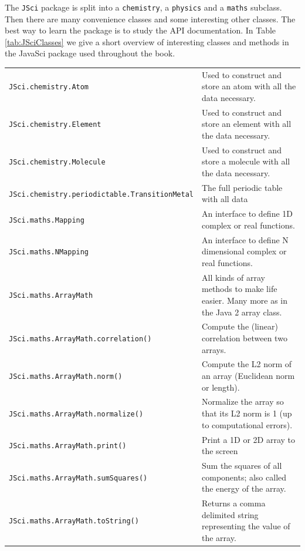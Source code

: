 The \verb|JSci| package is split into a 
\verb|chemistry|, a \verb|physics| and a \verb|maths| subclass.
Then there are many convenience classes and some interesting other classes.
The best way to learn the package is to study the API documentation. 
In Table \ref{tab:JSciClasses} we give a short overview of interesting 
classes and methods in the JavaSci package used throughout the book.
\begin{table}
  \begin{center} \small
    \begin{tabular}{ll}
      \verb|JSci.chemistry.Atom| & Used to construct and store an atom 
                                   with all the data necessary.\\
      \verb|JSci.chemistry.Element| & Used to construct and store an element 
                                   with all the data necessary.\\
      \verb|JSci.chemistry.Molecule| & Used to construct and store a molecule 
                                   with all the data necessary.\\
      \verb|JSci.chemistry.periodictable.TransitionMetal| & The full periodic
         table with all data\\\hline
      \verb|JSci.maths.Mapping| & An interface to define 1D complex or real
                functions.\\
      \verb|JSci.maths.NMapping| & An interface to define N dimensional 
                complex or real functions.\\\hline
      \verb|JSci.maths.ArrayMath| & All kinds of array methods to make
                  life easier. Many more as in the Java 2 array class. \\
\verb|JSci.maths.ArrayMath.correlation()| & 
              Compute the (linear) correlation between two arrays. \\
\verb|JSci.maths.ArrayMath.norm()| & 
       Compute the L2 norm of an array (Euclidean norm or length). \\
\verb|JSci.maths.ArrayMath.normalize()| & 
   Normalize the array so that its L2 norm is 1 (up to computational errors).\\
\verb|JSci.maths.ArrayMath.print()| & Print a 1D or 2D array to the screen\\
 \verb|JSci.maths.ArrayMath.sumSquares()| & 
   Sum the squares of all components; also called the energy of the array. \\
 \verb|JSci.maths.ArrayMath.toString()| & 
  Returns a comma delimited string representing the value of the array. \\\hline

\end{tabular}
\end{center}
\end{table}
